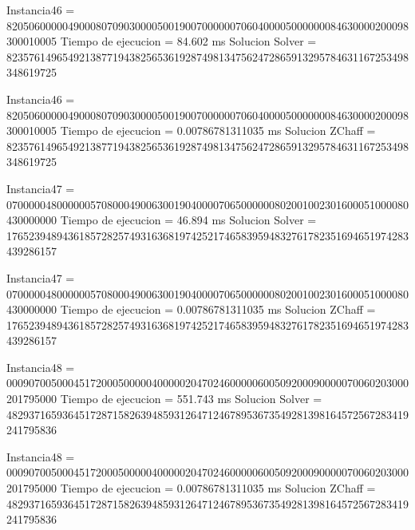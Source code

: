 Instancia46 = 820506000004900080709030000500190070000007060400005000000084630000200098300010005
Tiempo de ejecucion = 84.602 ms
Solucion Solver = 823576149654921387719438256536192874981347562472865913295784631167253498348619725

Instancia46 = 820506000004900080709030000500190070000007060400005000000084630000200098300010005
Tiempo de ejecucion = 0.00786781311035 ms
Solucion ZChaff = 823576149654921387719438256536192874981347562472865913295784631167253498348619725

Instancia47 = 070000048000000570800049006300190400007065000000802001002301600051000080430000000
Tiempo de ejecucion = 46.894 ms
Solucion Solver = 176523948943618572825749316368197425217465839594832761782351694651974283439286157

Instancia47 = 070000048000000570800049006300190400007065000000802001002301600051000080430000000
Tiempo de ejecucion = 0.00786781311035 ms
Solucion ZChaff = 176523948943618572825749316368197425217465839594832761782351694651974283439286157

Instancia48 = 000907005000451720005000004000002047024600000600509200090000070060203000201795000
Tiempo de ejecucion = 551.743 ms
Solucion Solver = 482937165936451728715826394859312647124678953673549281398164572567283419241795836

Instancia48 = 000907005000451720005000004000002047024600000600509200090000070060203000201795000
Tiempo de ejecucion = 0.00786781311035 ms
Solucion ZChaff = 482937165936451728715826394859312647124678953673549281398164572567283419241795836